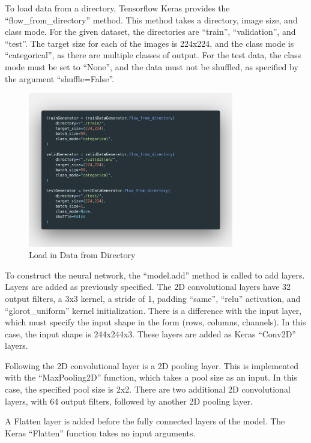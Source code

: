To load data from a directory, Tensorflow Keras provides the
``flow\_from\_directory'' method. This method takes a directory, image size, and
class mode. For the given dataset, the directories are ``train'',
``validation'', and ``test''. The target size for each of the images is 224x224,
and the class mode is ``categorical'', as there are multiple classes of output.
For the test data, the class mode must be set to ``None'', and the data must not
be shuffled, as specified by the argument ``shuffle=False''.

\begin{figure}[H]
	\centering
	\includegraphics[width=0.8\textwidth]{images/Code/loadDataFromDir}
	\caption{Load in Data from Directory}
	\label{fig:flow}
\end{figure}

To construct the neural network, the ``model.add'' method is called to add
layers. Layers are added as previously specified. The 2D convolutional layers
have 32 output filters, a 3x3 kernel, a stride of 1, padding ``same'', ``relu''
activation, and ``glorot\_uniform'' kernel initialization. There is a difference
with the input layer, which must specify the input shape in the form (rows,
columns, channels). In this case, the input shape is 244x244x3. These layers are
added as Keras ``Conv2D'' layers.

Following the 2D convolutional layer is a 2D pooling layer. This is implemented
with the ``MaxPooling2D'' function, which takes a pool size as an input. In this
case, the specified pool size is 2x2. There are two additional 2D convolutional
layers, with 64 output filters, followed by another 2D pooling layer.

A Flatten layer is added before the fully connected layers of the model. The
Keras ``Flatten'' function takes no input arguments.

